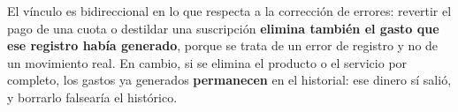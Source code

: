 \documentclass[12pt]{article}
\begin{document}
El vínculo es bidireccional en lo que respecta a la corrección de errores: revertir el pago de una cuota o destildar una suscripción \textbf{elimina también el gasto que ese registro había generado}, porque se trata de un error de registro y no de un movimiento real. En cambio, si se elimina el producto o el servicio por completo, los gastos ya generados \textbf{permanecen} en el historial: ese dinero sí salió, y borrarlo falsearía el histórico.






\end{document}
